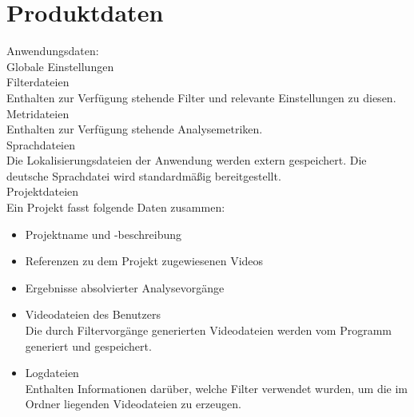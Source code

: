 

\chapter{Produktdaten}
\setcounter{counterKriterien}{0}
Anwendungsdaten: \\
 Globale Einstellungen \\
 Filterdateien \\
Enthalten zur Verfügung stehende Filter und relevante Einstellungen zu diesen. \\
 Metridateien \\
Enthalten zur Verfügung stehende Analysemetriken. \\
 Sprachdateien \\
Die Lokalisierungsdateien der Anwendung werden extern gespeichert. Die deutsche Sprachdatei wird standardmäßig bereitgestellt. \\
 Projektdateien \\
Ein Projekt fasst folgende Daten zusammen:
\begin{itemize}
\item Projektname und -beschreibung
\item Referenzen zu dem Projekt zugewiesenen Videos
\item Ergebnisse absolvierter Analysevorgänge
\item Videodateien des Benutzers \\
Die durch Filtervorgänge generierten Videodateien werden vom Programm generiert und gespeichert.
\item Logdateien\\
Enthalten Informationen darüber, welche Filter verwendet wurden, um die im Ordner liegenden Videodateien zu erzeugen.
\end{itemize}